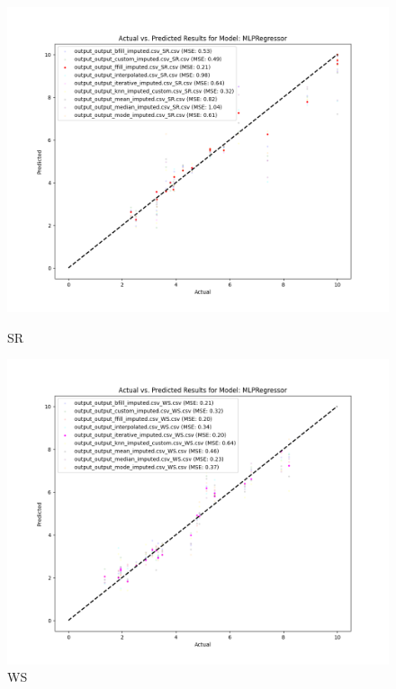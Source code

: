 \begin{figure}[H]
    \centering
    \begin{minipage}{0.495\textwidth}
        \centering
        \includegraphics[width=\linewidth]{reg_section_specxtra/images_reg_training/SR_MLPRegressor_plot.png}
        \caption{SR}
        \label{fig_reg_specxtra:sr_reg_training}
    \end{minipage}\hfill
    \begin{minipage}{0.495\textwidth}
        \centering
        \includegraphics[width=\linewidth]{reg_section_specxtra/images_reg_training/WS_MLPRegressor_plot.png}
        \caption{WS}
        \label{fig_reg_specxtra:ws_reg_training}
    \end{minipage}
\end{figure}


